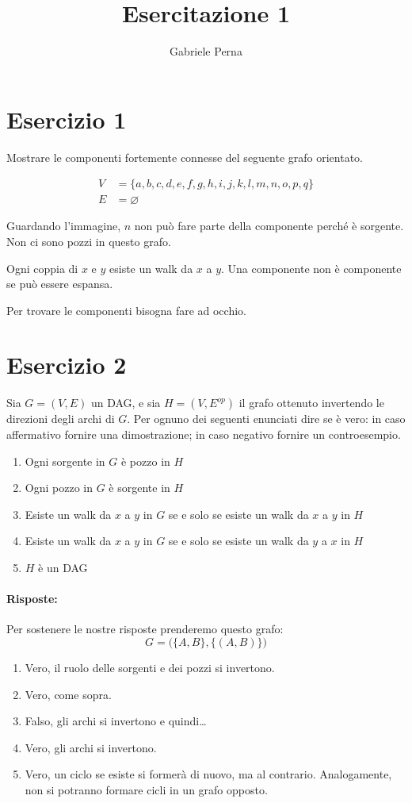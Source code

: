\documentclass[a4paper,12pt]{article}
\title{Esercitazione 1}
\author{Gabriele Perna}
\date{}
\begin{document}
\section{Esercizio 1}
Mostrare le componenti fortemente connesse del seguente grafo orientato.

\[
\begin{aligned}
V &= \{a,b,c,d,e,f,g,h,i,j,k,l,m,n,o,p,q\} \\
E &= \varnothing
\end{aligned}
\]

Guardando l'immagine, $n$ non può fare parte della componente perché è sorgente.
Non ci sono pozzi in questo grafo.

Ogni coppia di $x$ e $y$ esiste un walk da $x$ a $y$.  
Una componente non è componente se può essere espansa.

Per trovare le componenti bisogna fare ad occhio.

\section{Esercizio 2}
Sia $G = (V,E)$ un DAG, e sia $H = (V,E^{op})$ il grafo ottenuto invertendo le direzioni degli archi di $G$.
Per ognuno dei seguenti enunciati dire se è vero: in caso affermativo fornire una dimostrazione; in caso negativo fornire un controesempio.

\begin{enumerate}
    \item Ogni sorgente in $G$ è pozzo in $H$
    \item Ogni pozzo in $G$ è sorgente in $H$
    \item Esiste un walk da $x$ a $y$ in $G$ se e solo se esiste un walk da $x$ a $y$ in $H$
    \item Esiste un walk da $x$ a $y$ in $G$ se e solo se esiste un walk da $y$ a $x$ in $H$
    \item $H$ è un DAG
\end{enumerate}

\paragraph{Risposte:}

Per sostenere le nostre risposte prenderemo questo grafo:
\[
G = \big(\{A,B\}, \{(A,B)\}\big)
\]

\begin{enumerate}
    \item Vero, il ruolo delle sorgenti e dei pozzi si invertono.
    \item Vero, come sopra.
    \item Falso, gli archi si invertono e quindi\ldots
    \item Vero, gli archi si invertono.
    \item Vero, un ciclo se esiste si formerà di nuovo, ma al contrario. Analogamente, non si potranno formare cicli in un grafo opposto.
\end{enumerate}
\end{document}
